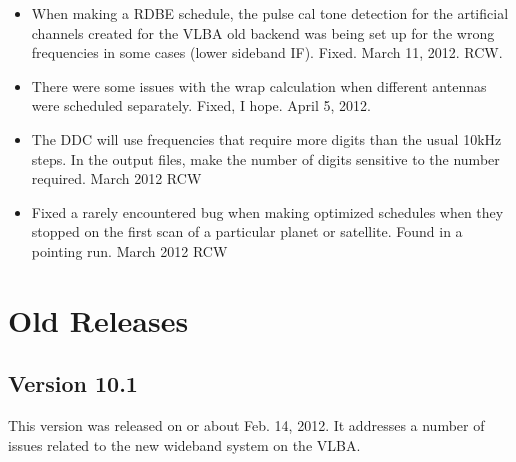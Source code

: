 \documentclass{report}
\begin{document}
\begin{itemize}
\item When making a RDBE schedule, the pulse cal tone detection for
the artificial channels created for the VLBA old backend was being 
set up for the wrong frequencies in some cases (lower sideband IF).
Fixed.  March 11, 2012.  RCW.

\item There were some issues with the wrap calculation when different
antennas were scheduled separately.  Fixed, I hope.  April 5, 2012.

\item The DDC will use frequencies that require more digits than the 
usual 10kHz steps.  In the output files, make the number of digits
sensitive to the number required.  March 2012 RCW

\item Fixed a rarely encountered bug when making optimized schedules when
they stopped on the first scan of a particular planet or satellite.
Found in a pointing run.  March 2012  RCW

\end{itemize}




\section{\label{SSEC:OLDRELEASE}Old Releases}


\subsection{\label{SSEC:VER_10.1}Version 10.1}

This version was released on or about Feb. 14, 2012.  It addresses a number 
of issues related to the new wideband system on the VLBA.
\end{document}
